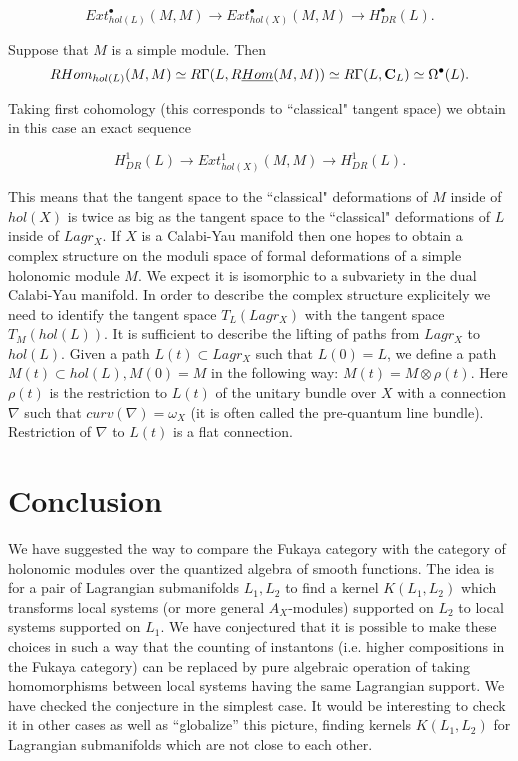 \documentclass[a4paper,12pt]{article}
\begin{document}
$$ Ext^{\bullet}_{hol(L)}(M,M)\to Ext^{\bullet}_{hol(X)}(M,M)\to H^{\bullet}_{DR}(L).$$

Suppose that $M$ is a simple module. Then
$$RHom_{hol(L)}(M,M)\simeq
R\Gamma(L,R\underline{Hom}(M,M))\simeq R\Gamma(L,{{\bf C}}_L)
\simeq \Omega^{\bullet}(L).$$

Taking first cohomology (this corresponds to ``classical" tangent space)
we obtain in this case an exact sequence

$$H^1_{DR}(L)\to Ext^1_{hol(X)}(M,M)\to H^1_{DR}(L).$$

This means that the tangent space to the ``classical" deformations
of $M$ inside of $hol(X)$ is twice as big as the tangent space to the
``classical" deformations of $L$ inside of $Lagr_X$.
If $X$ is a Calabi-Yau manifold then one hopes to obtain a complex
structure on the moduli space of formal deformations of a simple
holonomic module $M$. We expect it is isomorphic to a subvariety in the dual 
Calabi-Yau manifold.
In order to describe the complex structure explicitely
we need to identify the tangent
space $T_L(Lagr_X)$ with the tangent space $T_M(hol(L))$.
It is sufficient to describe the lifting of paths from $Lagr_X$ to
$hol(L)$. Given a path $L(t)\subset Lagr_X$ such that $L(0)=L$,
we define a path $M(t)\subset hol(L), M(0)=M$ in the following way:
$M(t)=M\otimes \rho(t)$. Here $\rho(t)$ is the restriction to $L(t)$
of the  unitary bundle over $X$
with a connection $\nabla$ such that $curv(\nabla)=\omega_X$
(it is often called the pre-quantum line bundle).
Restriction of $\nabla$ to $L(t)$ is a flat connection. 

\section{Conclusion}

We have suggested the way to compare the Fukaya category with the category
of holonomic modules over the quantized algebra of smooth functions.
The idea is for a pair of Lagrangian submanifolds $L_1,L_2$ to find
a kernel $K(L_1,L_2)$ which transforms local systems (or more general
$A_X$-modules) supported on $L_2$ to local systems supported on $L_1$.
We have conjectured that it is possible to make these choices in such a way that
the counting of instantons (i.e. higher compositions in the Fukaya category)
can be replaced by pure algebraic operation of taking homomorphisms
between local systems having the same Lagrangian support. We have checked
the conjecture in the simplest case.
It would be interesting to check it in other cases as well as  ``globalize'' this picture, finding kernels
$K(L_1,L_2)$ for Lagrangian submanifolds which are not close to each other.
\end{document}
